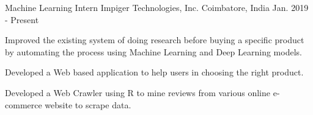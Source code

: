 \begin{cventries}
  \cventry
    {Machine Learning Intern}
    { Impiger Technologies, Inc.}
    {Coimbatore, India}
    {Jan. 2019 - Present}
    {
      \begin{cvitems}
      \item {Improved the existing system of doing research before buying a specific product by automating the process using Machine Learning and Deep Learning models.}
        \item {Developed a Web based application to help users in choosing the right product.}
        \item {Developed a Web Crawler using R to mine reviews from various online e-commerce website to scrape data.}
      \end{cvitems}
    }
\end{cventries}
